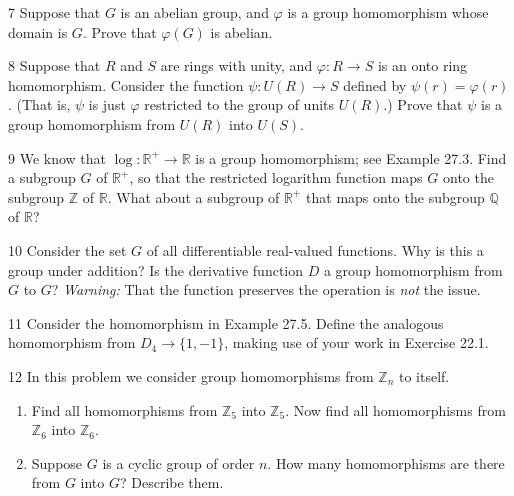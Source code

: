 \begin{problem}{7}
    Suppose that $G$ is an abelian group, and $\varphi$ is a group homomorphism whose
    domain is $G$. Prove that $\varphi(G)$ is abelian.
\end{problem}
\unsolved

\begin{problem}{8}
    Suppose that $R$ and $S$ are rings with unity, and $\varphi : R \to S$ is an onto ring
    homomorphism. Consider the function $\psi : U(R) \to S$ defined by
    $\psi(r) = \varphi(r)$. (That is, $\psi$ is just $\varphi$ restricted to the group of
    units $U(R)$.) Prove that $\psi$ is a group homomorphism from $U(R)$ into $U(S)$.
\end{problem}
\unsolved

\begin{problem}{9}
    We know that $\log : \mathbb{R}^+ \to \mathbb{R}$ is a group homomorphism; see
    Example 27.3. Find a subgroup $G$ of $\mathbb{R}^+$, so that the restricted logarithm
    function maps $G$ onto the subgroup $\mathbb{Z}$ of $\mathbb{R}$. What about a
    subgroup of $\mathbb{R}^+$ that maps onto the subgroup $\mathbb{Q}$ of $\mathbb{R}$?
\end{problem}
\unsolved

\begin{problem}{10}
    Consider the set $G$ of all differentiable real-valued functions. Why is this a group
    under addition? Is the derivative function $D$ a group homomorphism from $G$ to $G$?
    \emph{Warning:} That the function preserves the operation is \emph{not} the issue.
\end{problem}
\unsolved

\begin{problem}{11}
    Consider the homomorphism in Example 27.5. Define the analogous homomorphism from
    $D_4 \to \{1, -1\}$, making use of your work in Exercise 22.1.
\end{problem}
\unsolved

\begin{problem}{12}
    In this problem we consider group homomorphisms from $\mathbb{Z}_n$ to itself.
    \begin{enumerate}
        \item[(a)] Find all homomorphisms from $\mathbb{Z}_5$ into $\mathbb{Z}_5$. Now find
        all homomorphisms from $\mathbb{Z}_6$ into $\mathbb{Z}_6$.
        \item[(b)] Suppose $G$ is a cyclic group of order $n$. How many homomorphisms are
        there from $G$ into $G$? Describe them.
    \end{enumerate}
\end{problem}
\unsolved

